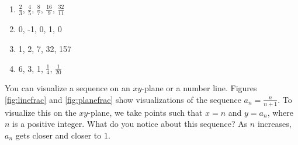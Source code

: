 \begin{Answer}[ref=seqcalc1]
\begin{enumerate}
\item $\frac{2}{3}$, $\frac{4}{5}$, $\frac{8}{7}$, $\frac{16}{9}$, 
$\frac{32}{11}$
\item 0, -1, 0, 1, 0
\item 1, 2, 7, 32, 157
\item 6, 3, 1, $\frac{1}{4}$, $\frac{1}{20}$
\end{enumerate}
\end{Answer}



You can visualize a sequence on an $xy$-plane or a number line. 
Figures \ref{fig:linefrac} and \ref{fig:planefrac} show visualizations 
of the sequence $a_n = \frac{n}{n+1}$. To visualize this on the 
$xy$-plane, we take points such that $x = n$ and $y = a_n$, where $n$ 
is a positive integer. What do you notice about this sequence? As $n$ 
increases, $a_n$ gets closer and closer to $1$. 

